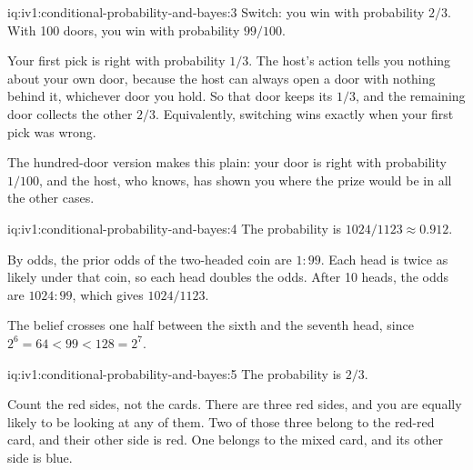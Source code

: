 \begin{solution}{iq:iv1:conditional-probability-and-bayes:3}
Switch: you win with probability $2/3$. With 100 doors, you win with probability $99/100$.

Your first pick is right with probability $1/3$. The host's action tells you nothing about your own door, because the host can always open a door with nothing behind it, whichever door you hold. So that door keeps its $1/3$, and the remaining door collects the other $2/3$. Equivalently, switching wins exactly when your first pick was wrong.

The hundred-door version makes this plain: your door is right with probability $1/100$, and the host, who knows, has shown you where the prize would be in all the other cases.

\end{solution}

\begin{solution}{iq:iv1:conditional-probability-and-bayes:4}
The probability is $1024/1123 \approx 0.912$.

By odds, the prior odds of the two-headed coin are $1 : 99$. Each head is twice as likely under that coin, so each head doubles the odds. After 10 heads, the odds are $1024 : 99$, which gives $1024/1123$.

The belief crosses one half between the sixth and the seventh head, since $2^6 = 64 < 99 < 128 = 2^7$.

\end{solution}

\begin{solution}{iq:iv1:conditional-probability-and-bayes:5}
The probability is $2/3$.

Count the red sides, not the cards. There are three red sides, and you are equally likely to be looking at any of them. Two of those three belong to the red-red card, and their other side is red. One belongs to the mixed card, and its other side is blue.


\end{solution}

